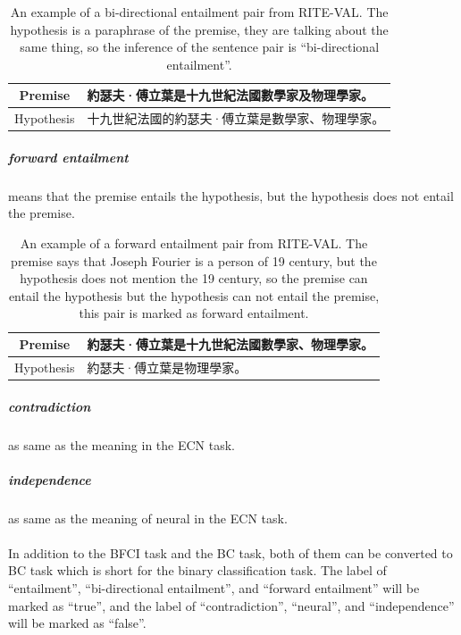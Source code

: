 \documentclass[12pt]{article}
\begin{document}
\begin{CJK*}{UTF8}{bkai}
\begin{spacing}{1.77}
\begin{table}[ht!]
  \centering
  \begin{tabular}{|c|l|}
    \hline
    Premise & 約瑟夫·傅立葉是十九世紀法國數學家及物理學家。 \\ \hline
    Hypothesis & 十九世紀法國的約瑟夫·傅立葉是數學家、物理學家。 \\ \hline
  \end{tabular}
  \caption[An example of a bi-directional entailment pair from RITE-VAL]{An example of a bi-directional entailment pair from RITE-VAL. The hypothesis is a paraphrase of the premise, they are talking about the same thing, so the inference of the sentence pair is ``bi-directional entailment''.}
\end{table}

\subparagraph{forward entailment} means that the premise entails the hypothesis, but the hypothesis does not entail the premise.

\begin{table}[ht!]
  \centering
  \begin{tabular}{|c|l|}
    \hline
    Premise & 約瑟夫·傅立葉是十九世紀法國數學家、物理學家。 \\ \hline
    Hypothesis & 約瑟夫·傅立葉是物理學家。 \\ \hline
  \end{tabular}
  \caption[An example of a forward entailment pair from RITE-VAL]{An example of a forward entailment pair from RITE-VAL. The premise says that Joseph Fourier is a person of 19 century, but the hypothesis does not mention the 19 century, so the premise can entail the hypothesis but the hypothesis can not entail the premise, this pair is marked as forward entailment.}
\end{table}

\subparagraph{contradiction} as same as the meaning in the ECN task.

\subparagraph{independence} as same as the meaning of neural in the ECN task.

\paragraph{}
In addition to the BFCI task and the BC task, both of them can be converted to BC task which is short for the binary classification task. The label of ``entailment'', ``bi-directional entailment'', and ``forward entailment'' will be marked as ``true'', and the label of ``contradiction'', ``neural'', and ``independence'' will be marked as ``false''.


\end{spacing}
\end{CJK*}
\end{document}
